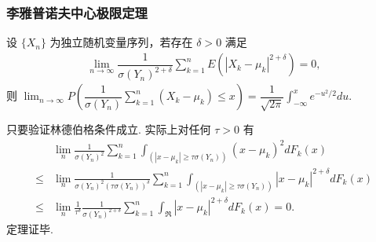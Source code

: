 \documentclass[Prob-All.tex]{subfiles}
\begin{document}
\begin{frame}
	\frametitle{李雅普诺夫中心极限定理}
	\begin{thm} 设 $\{X_n\}$ 为独立随机变量序列，若存在 $\delta>0$ 满足
		\begin{eqnarray*}
			\lim_{n\rightarrow\infty}\dfrac{1}{\sigma(Y_n)^{2+\delta}}\sum_{k=1}^nE(|X_k-\mu_k|^{2+\delta})=0,
		\end{eqnarray*}
		则 $\lim_{n\rightarrow\infty}P(\dfrac{1}{\sigma(Y_n)}\sum_{k=1}^n(X_k-\mu_k)\le x)=\dfrac{1}{\sqrt{2\pi}}\int_{-\infty}^xe^{-u^2/2}du$.

	\end{thm}

	\zheng 只要验证林德伯格条件成立. 实际上对任何 $\tau>0$ 有
	\begin{align*}
		& \lim _{n} \frac{1}{\sigma(Y_n)^{2}} \sum_{k=1}^{n} \int_{\left(\left|x-\mu_k\right| \geq \tau \sigma(Y_n)\right)}\left(x-\mu_{k}\right)^{2} d F_{k}(x) \\
		\leq & \lim _{n} \frac{1}{\sigma(Y_n)^{2}\left(\tau \sigma(Y_n)\right)^{\delta}} \sum_{k=1}^{n} \int_{\left(\left|x-\mu_k\right| \geq \tau \sigma(Y_n)\right)}\left|x-\mu_k\right|^{2+\delta} d F_{k}(x) \\
		\leq & \lim _{n} \frac{1}{\tau^{\delta}} \frac{1}{\sigma(Y_n)^{2+\delta}} \sum_{k=1}^{n} \int_{\Re}\left|x-\mu_{k}\right|^{2+\delta} d F_{k}(x)=0 .
	\end{align*}
	定理证毕.
\end{frame}
\end{document}
